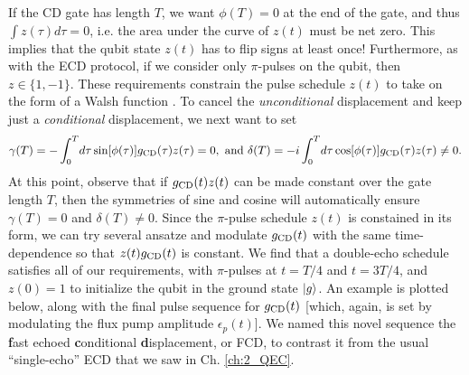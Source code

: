 If the CD gate has length $T$, we want $\phi(T) = 0$ at the end of the gate, and thus $\int z(\tau)d\tau = 0$, i.e. the area under the curve of $z(t)$ must be net zero. This implies that the qubit state $z(t)$ has to flip signs at least once! Furthermore, as with the ECD protocol, if we consider only $\pi$-pulses on the qubit, then $z \in \{1, -1\}$. These requirements constrain the pulse schedule $z(t)$ to take on the form of a Walsh function \cite{chalermpusitarak2021frame}. To cancel the \textit{unconditional} displacement and keep just a \textit{conditional} displacement, we next want to set
\begin{equation*}
    \gamma(T) = - \int_0^T \!d\tau \sin[\phi(\tau)] g_{\rm CD}(\tau)z(\tau) = 0, \,\,\text{and}\,\, \delta(T) = -i \int_0^T \!d\tau \cos[\phi(\tau)] g_{\rm CD}(\tau)z(\tau) \neq 0.
\end{equation*}
At this point, observe that if $g_{\rm CD}(t)z(t)$ can be made constant over the gate length $T$, then the symmetries of sine and cosine will automatically ensure $\gamma(T) = 0$ and $\delta(T) \neq 0$. Since the $\pi$-pulse schedule $z(t)$ is constained in its form, we can try several ansatze and modulate $g_{\rm CD}(t)$ with the same time-dependence so that $z(t)g_{\rm CD}(t)$ is constant. We find that a double-echo schedule satisfies all of our requirements, with $\pi$-pulses at $t = T/4$ and $t = 3T/4$, and $z(0)=1$ to initialize the qubit in the ground state $\lvert g\rangle$. An example is plotted below, along with the final pulse sequence for $g_{\rm CD}(t)$ [which, again, is set by modulating the flux pump amplitude $\epsilon_p(t)$]. We named this novel sequence the \textbf{f}ast echoed \textbf{c}onditional \textbf{d}isplacement, or FCD, to contrast it from the usual ``single-echo'' ECD that we saw in Ch. \ref{ch:2_QEC}. 

